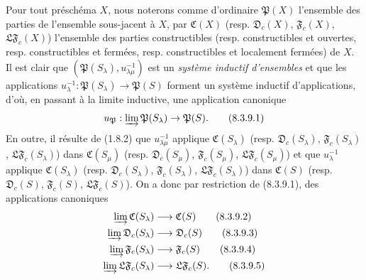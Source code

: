 \begin{env}[8.3.9]
\label{IV.8.3.9-fr}
Pour tout préschéma $X$, nous noterons comme d'ordinaire $\mathfrak P(X)$
l'ensemble des parties de l'ensemble sous-jacent à $X$, par $\mathfrak C(X)$
(resp. $\mathfrak D_c(X)$, $\mathfrak F_c(X)$, $\mathfrak{LF}_c(X)$)
l'ensemble des parties constructibles (resp. constructibles et ouvertes,
resp. constructibles et fermées, resp. constructibles et localement fermées)
de $X$. Il est clair que
$(\mathfrak P(S_\lambda),u_{\lambda\mu}^{-1})$ est un \emph{système inductif
d'ensembles} et que les applications
$u_\lambda^{-1}:\mathfrak P(S_\lambda)\to\mathfrak P(S)$ forment un système
inductif d'applications, d'où, en passant à la limite inductive, une
application canonique
\begin{equation}
u_{\mathfrak P}:\varinjlim\mathfrak P(S_\lambda)\to\mathfrak P(S).
\tag{8.3.9.1}\label{IV.8.3.9.1-fr}
\end{equation}
En outre, il résulte de (1.8.2) que $u_{\lambda\mu}^{-1}$ applique
$\mathfrak C(S_\lambda)$ (resp. $\mathfrak D_c(S_\lambda)$,
$\mathfrak F_c(S_\lambda)$, $\mathfrak{LF}_c(S_\lambda)$) dans
$\mathfrak C(S_\mu)$ (resp. $\mathfrak D_c(S_\mu)$,
$\mathfrak F_c(S_\mu)$, $\mathfrak{LF}_c(S_\mu)$) et que
$u_\lambda^{-1}$ applique $\mathfrak C(S_\lambda)$ (resp.
$\mathfrak D_c(S_\lambda)$, $\mathfrak F_c(S_\lambda)$,
$\mathfrak{LF}_c(S_\lambda)$) dans $\mathfrak C(S)$ (resp.
$\mathfrak D_c(S)$, $\mathfrak F_c(S)$, $\mathfrak{LF}_c(S)$). On a donc par
restriction de (8.3.9.1), des applications canoniques
\begin{align}
\varinjlim\mathfrak C(S_\lambda)&\longrightarrow\mathfrak C(S)
\tag{8.3.9.2}\label{IV.8.3.9.2-fr}\\
\varinjlim\mathfrak D_c(S_\lambda)&\longrightarrow\mathfrak D_c(S)
\tag{8.3.9.3}\label{IV.8.3.9.3-fr}\\
\varinjlim\mathfrak F_c(S_\lambda)&\longrightarrow\mathfrak F_c(S)
\tag{8.3.9.4}\label{IV.8.3.9.4-fr}\\
\varinjlim\mathfrak{LF}_c(S_\lambda)&\longrightarrow\mathfrak{LF}_c(S).
\tag{8.3.9.5}\label{IV.8.3.9.5-fr}
\end{align}
\end{env}

